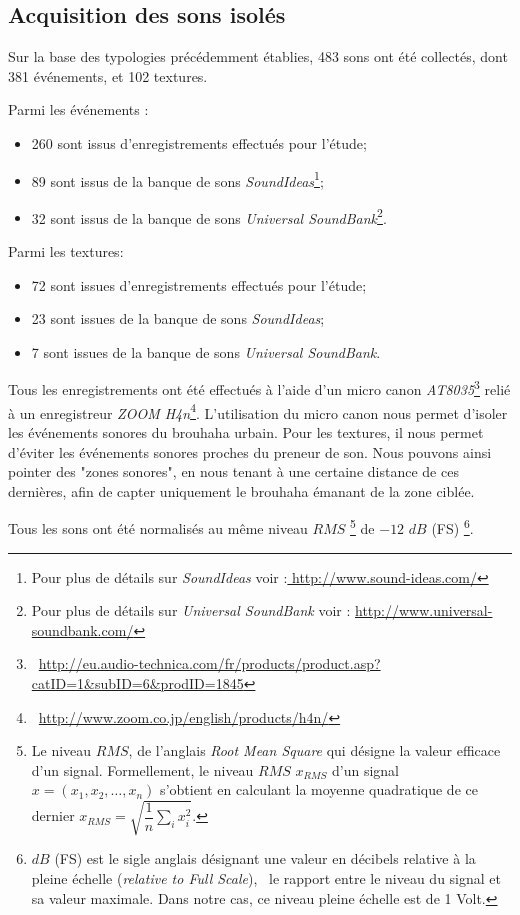 \subsection{Acquisition des sons isolés}
\label{sec:ch5_recordDataSet}

Sur la base des typologies précédemment établies, 483 sons ont été collectés, dont 381 événements, et 102 textures.

Parmi les événements :

\begin{itemize}
\item 260 sont issus d’enregistrements effectués pour l'étude;
\item 89 sont issus de la banque de sons \emph{SoundIdeas}\footnote{Pour plus de détails sur \emph{SoundIdeas} voir :\url{ http://www.sound-ideas.com/}};
\item 32 sont issus de la banque de sons \emph{Universal SoundBank}\footnote{Pour plus de détails sur \emph{Universal SoundBank} voir : \url{http://www.universal-soundbank.com/}}.
\end{itemize}

Parmi les textures:

\begin{itemize}
\item 72 sont issues d’enregistrements effectués pour l'étude;
\item 23 sont issues de la banque de sons \emph{SoundIdeas};
\item 7 sont issues de la banque de sons \emph{Universal SoundBank}.
\end{itemize}

Tous les enregistrements ont été effectués à l’aide d'un micro canon \emph{AT8035}\footnote{\cf~\url{http://eu.audio-technica.com/fr/products/product.asp?catID=1&subID=6&prodID=1845}} relié à un enregistreur \emph{ZOOM H4n}\footnote{\cf~\url{http://www.zoom.co.jp/english/products/h4n/}}. L’utilisation du micro canon nous permet d’isoler les événements sonores du brouhaha urbain. Pour les textures, il nous permet d’éviter les événements sonores proches du preneur de son. Nous pouvons ainsi pointer des "zones sonores", en nous tenant à une certaine distance de ces dernières, afin de capter uniquement le brouhaha émanant de la zone ciblée.

Tous les sons ont été normalisés au même niveau $RMS$ \footnote{Le niveau $RMS$, de l'anglais \emph{Root Mean Square} qui désigne la valeur efficace d'un signal. Formellement, le niveau $RMS$ $x_{RMS}$ d'un signal $x=(x_1,x_2,\ldots,x_n)$ s'obtient en calculant la moyenne quadratique de ce dernier $x_{RMS}=\sqrt{\dfrac{1}{n}\sum\limits_{i} x_i^2}$.} de $-12$ $dB$ (FS) \footnote{$dB$ (FS) est le sigle anglais désignant une valeur en décibels relative à la pleine échelle (\emph{relative to Full Scale}), \ie~le rapport entre le niveau du signal et sa valeur maximale. Dans notre cas, ce niveau pleine échelle est de 1 Volt.}.

